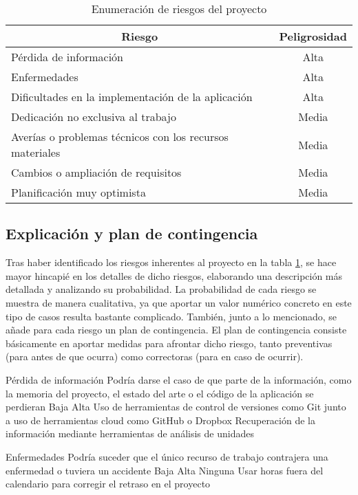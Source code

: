 \begin{table}[H]
	\centering
	\begin{tabular}{ |l|c| } 
		\hline
		\multicolumn{1}{|c|}{Riesgo} & 
		\multicolumn{1}{|c|}{Peligrosidad} \\
		\hline
			Pérdida de información										& Alta	\\
			Enfermedades												& Alta	\\
			Dificultades en la implementación de la aplicación			& Alta	\\
			Dedicación no exclusiva al trabajo							& Media	\\
			Averías o problemas técnicos con los recursos materiales	& Media	\\
			Cambios o ampliación de requisitos							& Media	\\
			Planificación muy optimista									& Media	\\
		\hline
	\end{tabular}
	\caption{Enumeración de riesgos del proyecto}
	\label{table:riesgos}
\end{table}


\subsection{Explicación y plan de contingencia}
Tras haber identificado los riesgos inherentes al proyecto en la tabla \ref{table:riesgos}, se hace mayor hincapié en los detalles de dicho riesgos, elaborando una descripción más detallada y analizando su probabilidad. La probabilidad de cada riesgo se muestra de manera cualitativa, ya que aportar un valor numérico concreto en este tipo de casos resulta bastante complicado. También, junto a lo mencionado, se añade para cada riesgo un plan de contingencia. El plan de contingencia consiste básicamente en aportar medidas para afrontar dicho riesgo, tanto preventivas (para antes de que ocurra) como correctoras (para en caso de ocurrir).

\riskframe
	{Pérdida de información}
	{Podría darse el caso de que parte de la información, como la memoria del proyecto, el estado del arte o el código de la aplicación se perdieran}
	{Baja}
	{Alta}
	{Uso de herramientas de control de versiones como Git junto a uso de herramientas cloud como GitHub o Dropbox}
	{Recuperación de la información mediante herramientas de análisis de unidades}

\riskframe
	{Enfermedades}
	{Podría suceder que el único recurso de trabajo contrajera una enfermedad o tuviera un accidente}
	{Baja}
	{Alta}
	{Ninguna}
	{Usar horas fuera del calendario para corregir el retraso en el proyecto}


